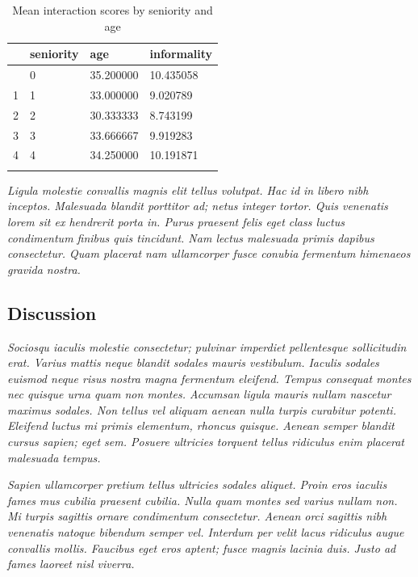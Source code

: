 \documentclass[
  a4paper,
]{scrbook}
\begin{document}
\begin{longtable}[]{@{}llll@{}}

\toprule\noalign{}
& seniority & age & informality \\
\midrule\noalign{}
\endhead
\bottomrule\noalign{}
\endlastfoot
0 & 0 & 35.200000 & 10.435058 \\
1 & 1 & 33.000000 & 9.020789 \\
2 & 2 & 30.333333 & 8.743199 \\
3 & 3 & 33.666667 & 9.919283 \\
4 & 4 & 34.250000 & 10.191871 \\


\caption{\label{tbl-mean-informality}Mean interaction scores by
seniority and age}

\tabularnewline
\end{longtable}

\emph{Ligula molestie convallis magnis elit tellus volutpat. Hac id in
libero nibh inceptos. Malesuada blandit porttitor ad; netus integer
tortor. Quis venenatis lorem sit ex hendrerit porta in. Purus praesent
felis eget class luctus condimentum finibus quis tincidunt. Nam lectus
malesuada primis dapibus consectetur. Quam placerat nam ullamcorper
fusce conubia fermentum himenaeos gravida nostra.}

\subsection{Discussion}\label{discussion}

\emph{Sociosqu iaculis molestie consectetur; pulvinar imperdiet
pellentesque sollicitudin erat. Varius mattis neque blandit sodales
mauris vestibulum. Iaculis sodales euismod neque risus nostra magna
fermentum eleifend. Tempus consequat montes nec quisque urna quam non
montes. Accumsan ligula mauris nullam nascetur maximus sodales. Non
tellus vel aliquam aenean nulla turpis curabitur potenti. Eleifend
luctus mi primis elementum, rhoncus quisque. Aenean semper blandit
cursus sapien; eget sem. Posuere ultricies torquent tellus ridiculus
enim placerat malesuada tempus.}

\emph{Sapien ullamcorper pretium tellus ultricies sodales aliquet. Proin
eros iaculis fames mus cubilia praesent cubilia. Nulla quam montes sed
varius nullam non. Mi turpis sagittis ornare condimentum consectetur.
Aenean orci sagittis nibh venenatis natoque bibendum semper vel.
Interdum per velit lacus ridiculus augue convallis mollis. Faucibus eget
eros aptent; fusce magnis lacinia duis. Justo ad fames laoreet nisl
viverra.}
\end{document}
